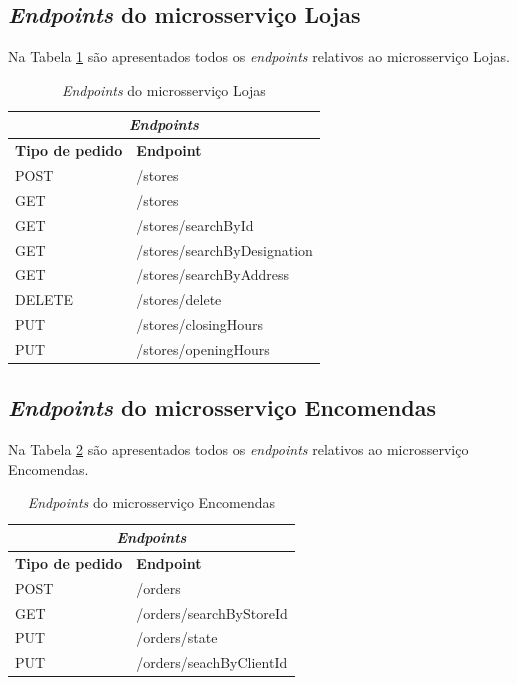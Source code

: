 \subsection{\textit{Endpoints} do microsserviço Lojas}
Na Tabela \ref{table:endpoints4} são apresentados todos os \textit{endpoints} relativos ao microsserviço Lojas.

\begin{table}[H]
\caption{\textit{Endpoints} do microsserviço Lojas}
\label{table:endpoints4}
\begin{center}
\begin{tabular}{ |p{4cm}|p{6cm}|  }
\hline
\multicolumn{2}{|c|}{\textit{Endpoints}} \\
\hline
\textbf{Tipo de pedido} & \textbf{Endpoint}\\
\hline 
POST & /stores \\
\hline
GET & /stores \\
\hline
GET & /stores/searchById \\
\hline
GET & /stores/searchByDesignation \\
\hline
GET & /stores/searchByAddress \\
\hline
DELETE & /stores/delete \\
\hline
PUT & /stores/closingHours \\
\hline
PUT & /stores/openingHours \\
\hline
\end{tabular} 
\end{center}
\end{table}

\subsection{\textit{Endpoints} do microsserviço Encomendas}
Na Tabela \ref{table:endpoints5} são apresentados todos os \textit{endpoints} relativos ao microsserviço Encomendas.

\begin{table}[H]
\caption{\textit{Endpoints} do microsserviço Encomendas}
\label{table:endpoints5}
\begin{center}
\begin{tabular}{ |p{4cm}|p{6cm}|  }
\hline
\multicolumn{2}{|c|}{\textit{Endpoints}} \\
\hline
\textbf{Tipo de pedido} & \textbf{Endpoint}\\
\hline
POST & /orders \\
\hline
GET & /orders/searchByStoreId \\
\hline
PUT & /orders/state  \\
\hline
PUT & /orders/seachByClientId \\
\hline
\end{tabular} 
\end{center}
\end{table}

